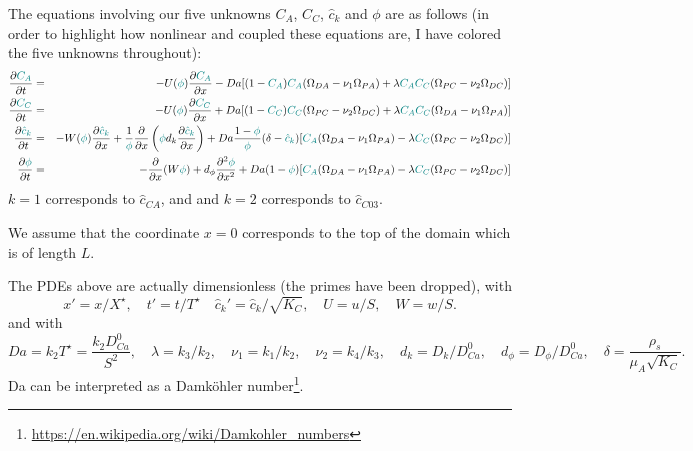 \documentclass[a4paper]{article}
\newcommand{\nn}{\nonumber}
\begin{document}
The equations involving our five unknowns $C_A$, $C_C$, $\hat{c}_k$ and $\phi$ are as follows (in
order to highlight how nonlinear and coupled these equations are, I have colored the 
five unknowns throughout):
\begin{eqnarray}
\frac{\partial {\color{teal} C_A}}{\partial t} 
&=& -U({\color{teal}\phi}) \frac{\partial {\color{teal}C_A}}{\partial x} 
- Da[(1-{\color{teal}C_A}){\color{teal}C_A}(\Omega_{DA}-\nu_1\Omega_{PA})+
\lambda {\color{teal}C_AC_C} (\Omega_{PC}-\nu_2\Omega_{DC})]
\nn\\
\frac{\partial {\color{teal}C_C}}{\partial t} 
&=& -U({\color{teal}\phi}) \frac{\partial {\color{teal}C_C}}{\partial x}  
+ Da[(1-{\color{teal}C_C}){\color{teal}C_C}(\Omega_{PC}-\nu_2\Omega_{DC})+
\lambda {\color{teal}C_AC_C} (\Omega_{DA}-\nu_1\Omega_{PA})]
\nn\\
\frac{\partial {\color{teal}\hat{c}_k}}{\partial t} 
&=& -W({\color{teal}\phi}) \frac{\partial {\color{teal}\hat{c}_k}}{\partial x}
+\frac{1}{\color{teal}\phi} \frac{\partial}{\partial x} 
\left( {\color{teal}\phi} d_k \frac{\partial {\color{teal}\hat{c}_k}}{\partial x} \right)
+Da \frac{1-{\color{teal}\phi}}{{\color{teal}\phi}}(\delta-{\color{teal}\hat{c}_k})
[{\color{teal}C_A}(\Omega_{DA}-\nu_1\Omega_{PA})-\lambda 
{\color{teal}C_C} (\Omega_{PC}-\nu_2 \Omega_{DC})  ]
\nn\\ 
\frac{\partial {\color{teal}\phi}}{\partial t} 
&=& -\frac{\partial}{\partial x} (W {\color{teal}\phi})
+d_{\phi} \frac{\partial^2 {\color{teal}\phi}}{\partial x^2} + Da (1-{\color{teal}\phi})
[{\color{teal}C_A}(\Omega_{DA}-\nu_1 \Omega_{PA})-\lambda 
{\color{teal}C_C} (\Omega_{PC}-\nu_2 \Omega_{DC})] \nn
\end{eqnarray}
$k=1$ corresponds to $\hat{c}_{CA}$, and
and $k=2$ corresponds to $\hat{c}_{C03}$.

We assume that the coordinate $x=0$ corresponds to the top of the domain
which is of length $L$. 

The PDEs above are actually dimensionless (the primes have been dropped), with 
\[
x'=x/X^\star, \quad t'=t/T^\star \quad \hat{c}_k'=\hat{c}_k/\sqrt{K_C},
\quad U=u/S, \quad W=w/S.
\]
and with 
\[
Da=k_2 T^\star = \frac{k_2 D_{Ca}^0}{S^2},
\quad
\lambda=k_3/k_2,
\quad
\nu_1=k_1/k_2,
\quad
\nu_2=k_4/k_3,
\quad
d_k=D_k/D_{Ca}^0, 
\quad
d_\phi=D_\phi/D_{Ca}^0,
\quad
\delta=\frac{\rho_s}{\mu_A \sqrt{K_C}}.
\]
Da can be interpreted as a Damköhler number\footnote{\url{https://en.wikipedia.org/wiki/Damkohler_numbers}}. 


\end{document}
